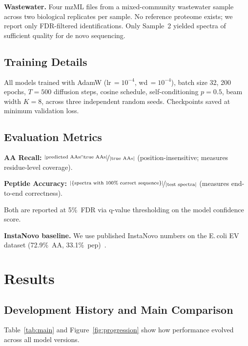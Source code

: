 \documentclass{article}
\begin{document}
\textbf{Wastewater.} Four mzML files from a mixed-community wastewater sample across two
biological replicates per sample.
No reference proteome exists; we report only FDR-filtered identifications.
Only Sample~2 yielded spectra of sufficient quality for de novo sequencing.

\subsection{Training Details}

All models trained with AdamW (lr\,$=10^{-4}$, wd\,$=10^{-4}$), batch size 32, 200 epochs,
$T\!=\!500$ diffusion steps, cosine schedule, self-conditioning $p\!=\!0.5$, beam width $K\!=\!8$,
across three independent random seeds. Checkpoints saved at minimum validation loss.

\subsection{Evaluation Metrics}

\textbf{AA Recall:}
$\nicefrac{|\text{predicted AAs} \cap \text{true AAs}|}{|\text{true AAs}|}$
(position-insensitive; measures residue-level coverage).

\textbf{Peptide Accuracy:}
$\nicefrac{|\{\text{spectra with 100\% correct sequence}\}|}{|\text{test spectra}|}$
(measures end-to-end correctness).

Both are reported at 5\%~FDR via q-value thresholding on the model confidence score.

\textbf{InstaNovo baseline.} We use published InstaNovo numbers on the E.\,coli EV dataset
(72.9\%~AA, 33.1\%~pep)~\citep{instanovo2024}.

\section{Results}

\subsection{Development History and Main Comparison}

Table~\ref{tab:main} and Figure~\ref{fig:progression} show how performance evolved across all model versions.
\end{document}
